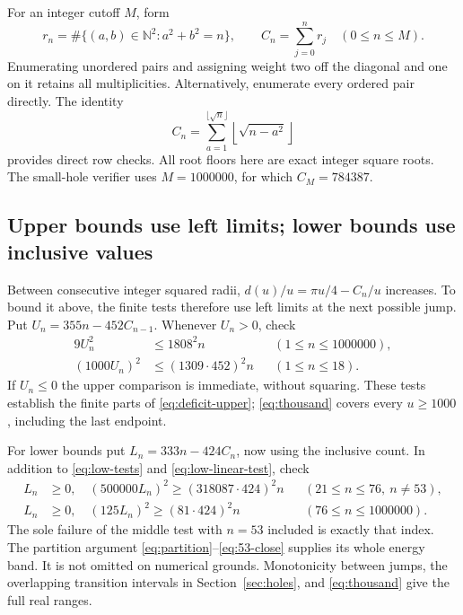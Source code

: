 \documentclass[11pt,reqno]{amsart}
\numberwithin{equation}{section}
\newcommand{\N}{\mathbb N}
\begin{document}
For an integer cutoff $M$, form
\begin{equation}\label{eq:count-array}
 r_n=\#\{(a,b)\in\N^2:a^2+b^2=n\},\qquad
 C_n=\sum_{j=0}^n r_j\quad(0\le n\le M).
\end{equation}
Enumerating unordered pairs and assigning weight two off
the diagonal and one on it retains all multiplicities.
Alternatively, enumerate every ordered pair directly.
The identity
\begin{equation}\label{eq:count-row}
 C_n=\sum_{a=1}^{\lfloor\sqrt n\rfloor}
                 \left\lfloor\sqrt{n-a^2}\right\rfloor
\end{equation}
provides direct row checks. All root floors here are exact
integer square roots. The small-hole verifier uses
$M=1000000$, for which $C_M=784387$.

\subsection*{Upper bounds use left limits; lower bounds use inclusive values}

Between consecutive integer squared radii,
$d(u)/u=\pi u/4-C_n/u$ increases. To bound it above, the
finite tests therefore use left limits at the next possible
jump. Put $U_n=355n-452C_{n-1}$. Whenever $U_n>0$, check
\begin{align}
 9U_n^2&\le1808^2n
      &&(1\le n\le1000000),\label{eq:cert-upper}\\
 (1000U_n)^2&\le(1309\cdot452)^2n
      &&(1\le n\le18).\label{eq:cert-prefix}
\end{align}
If $U_n\le0$ the upper comparison is immediate, without
squaring. These tests establish the finite parts of
\eqref{eq:deficit-upper}; \eqref{eq:thousand} covers every
$u\ge1000$, including the last endpoint.

For lower bounds put $L_n=333n-424C_n$, now using the
inclusive count. In addition to \eqref{eq:low-tests} and
\eqref{eq:low-linear-test}, check
\begin{align}
 L_n&\ge0,\quad
 (500000L_n)^2\ge(318087\cdot424)^2n
 &&(21\le n\le76,\ n\ne53),\label{eq:cert-hole-middle}\\
 L_n&\ge0,\quad
 (125L_n)^2\ge(81\cdot424)^2n
 &&(76\le n\le1000000).\label{eq:cert-hole-high}
\end{align}
The sole failure of the middle test with $n=53$ included
is exactly that index. The partition argument
\eqref{eq:partition}--\eqref{eq:53-close} supplies its whole
energy band. It is not omitted on numerical grounds.
Monotonicity between jumps, the overlapping transition
intervals in Section~\ref{sec:holes}, and
\eqref{eq:thousand} give the full real ranges.
\end{document}
